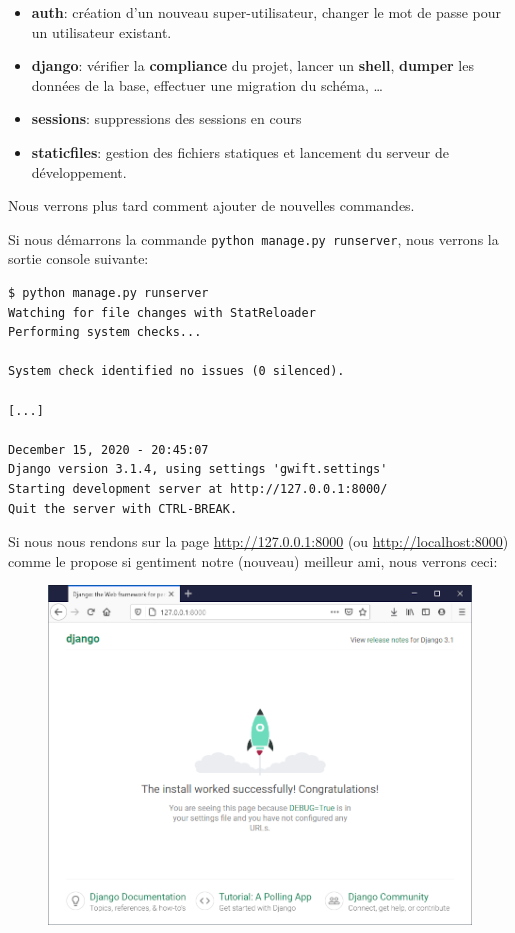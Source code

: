 \documentclass[11pt]{amsbook}
\begin{document}
\begin{itemize}

\item \textbf{auth}: création d’un nouveau super-utilisateur, changer le mot de passe pour un utilisateur existant.

\item \textbf{django}: vérifier la \textbf{compliance} du projet, lancer un \textbf{shell}, \textbf{dumper} les données de la base, effectuer une migration du schéma, …​

\item \textbf{sessions}: suppressions des sessions en cours

\item \textbf{staticfiles}: gestion des fichiers statiques et lancement du serveur de développement.

\end{itemize}


Nous verrons plus tard comment ajouter de nouvelles commandes.


Si nous démarrons la commande \texttt{python manage.py runserver}, nous verrons la sortie console suivante:


\begin{verbatim}
$ python manage.py runserver
Watching for file changes with StatReloader
Performing system checks...

System check identified no issues (0 silenced).

[...]

December 15, 2020 - 20:45:07
Django version 3.1.4, using settings 'gwift.settings'
Starting development server at http://127.0.0.1:8000/
Quit the server with CTRL-BREAK.
\end{verbatim}

Si nous nous rendons sur la page \href{http://127.0.0.1:8000}{http://127.0.0.1:8000} (ou \href{http://localhost:8000}{http://localhost:8000}) comme le propose si gentiment notre (nouveau) meilleur ami, nous verrons ceci:


\begin{figure}[h]{}
\centering\includegraphics[width=2.5truein]{images/django/manage-runserver.png}
\caption{}

\end{figure}
\end{document}
